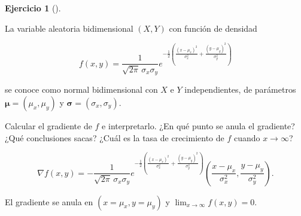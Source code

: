 \documentclass[
  a4paper,
]{scrreport}
\theoremstyle{definition}
\newtheorem{exercise}{Ejercicio}[chapter]
\theoremstyle{remark}
\begin{document}
\begin{exercise}[]\protect\hypertarget{exr-normal-bidimensional}{}\label{exr-normal-bidimensional}

La variable aleatoria bidimensional \((X,Y)\) con función de densidad

\[
f(x,y) = \frac{1}{\sqrt{2\pi}\, \sigma_x\sigma_y} e^{-\frac{1}{2}\left(\frac{(x-\mu_x)^2}{\sigma_x^2}+\frac{(y-\mu_y)^2}{\sigma_y^2}\right)}
\]

se conoce como normal bidimensional con \(X\) e \(Y\) independientes, de
parámetros \(\mathbf{\mu}=(\mu_x,\mu_y)\) y
\(\mathbf{\sigma}=(\sigma_x,\sigma_y)\).

Calcular el gradiente de \(f\) e interpretarlo. ¿En qué punto se anula
el gradiente? ¿Qué conclusiones sacas? ¿Cuál es la tasa de crecimiento
de \(f\) cuando \(x\rightarrow \infty\)?

\end{exercise}

\begin{tcolorbox}[enhanced jigsaw, toprule=.15mm, bottomrule=.15mm, coltitle=black, toptitle=1mm, breakable, left=2mm, arc=.35mm, title=\textcolor{quarto-callout-tip-color}{\faLightbulb}\hspace{0.5em}{Solución}, titlerule=0mm, colback=white, colbacktitle=quarto-callout-tip-color!10!white, colframe=quarto-callout-tip-color-frame, bottomtitle=1mm, rightrule=.15mm, leftrule=.75mm, opacitybacktitle=0.6, opacityback=0]

\[
\nabla f(x,y) = -\frac{1}{\sqrt{2\pi}\, \sigma_x\sigma_y} e^{-\frac{1}{2}\left(\frac{(x-\mu_x)^2}{\sigma_x^2}+\frac{(y-\mu_y)^2}{\sigma_y^2}\right)} \left(\frac{x-\mu_x}{\sigma_x^2}, \frac{y-\mu_y}{\sigma_y^2}\right).
\]

El gradiente se anula en \((x=\mu_x, y=\mu_y)\) y
\(\lim_{x\rightarrow \infty}f(x,y) = 0\).

\end{tcolorbox}
\end{document}

